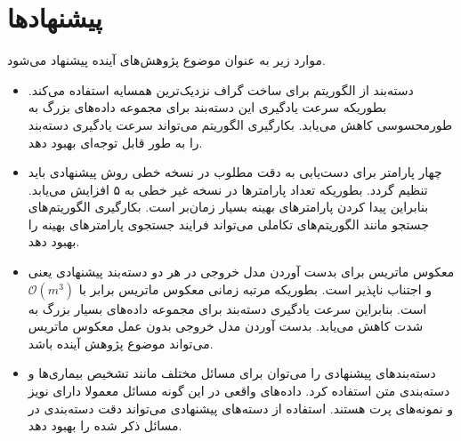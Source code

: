 \section{پیشنهادها}\label{sec:6:4}
موارد زیر به عنوان موضوع پژوهش‌های آینده پیشنهاد می‌شود.
\begin{itemize}[label=$\bullet$]
	\item دسته‌بند   از الگوریتم   برای ساخت گراف نزدیک‌ترین همسایه استفاده می‌کند. بطوریکه سرعت یادگیری این دسته‌بند برای مجموعه داده‌های بزرگ به طورمحسوسی کاهش می‌یابد. بکارگیری الگوریتم   می‌تواند سرعت یادگیری دسته‌بند را به طور قابل توجه‌ای بهبود دهد.
	\item چهار پارامتر برای دست‌یابی به دقت مطلوب در نسخه خطی روش پیشنهادی   باید تنظیم گردد. بطوریکه تعداد پارامترها در نسخه غیر خطی به ۵ افزایش می‌یابد.  بنابراین  پیدا کردن پارامترهای بهینه بسیار زمان‌بر است. بکارگیری الگوریتم‌های جستجو مانند الگوریتم‌های تکاملی می‌تواند فرایند جستجوی پارامترهای بهینه را بهبود دهد.
	\item معکوس ماتریس برای بدست آوردن مدل خروجی در هر دو دسته‌بند پیشنهادی یعنی  و   اجتناب ناپذیر است. بطوریکه مرتبه زمانی معکوس ماتریس  برابر با $\mathcal{O}(m^{3})$ است. بنابراین سرعت یادگیری دسته‌بند برای مجموعه داده‌های بسیار بزرگ به شدت کاهش می‌یابد. بدست آوردن مدل خروجی بدون عمل معکوس ماتریس می‌تواند موضوع پژوهش آینده باشد.
	\item دسته‌بندهای پیشنهادی را می‌توان برای مسائل مختلف مانند تشخیص بیماری‌ها و دسته‌بندی متن استفاده کرد. داده‌های واقعی در این گونه مسائل معمولا دارای نویز و نمونه‌های پرت هستند. استفاده از دسته‌های پیشنهادی می‌تواند دقت دسته‌بندی در مسائل ذکر شده را بهبود دهد.  
\end{itemize}

